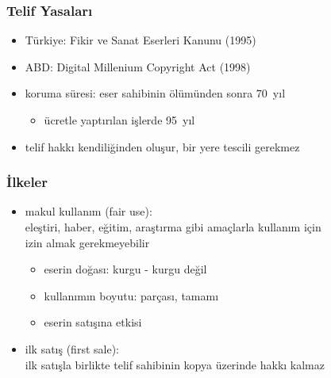 \documentclass[dvipsnames]{beamer}
\theoremstyle{definition}
\theoremstyle{example}
\theoremstyle{plain}
\begin{document}
\begin{frame}
  \frametitle{Telif Yasaları}

  \begin{itemize}
    \item Türkiye: Fikir ve Sanat Eserleri Kanunu (1995)
    \item ABD: Digital Millenium Copyright Act (1998)

    \pause
    \medskip
    \item koruma süresi: eser sahibinin ölümünden sonra 70~yıl
    \begin{itemize}
      \item ücretle yaptırılan işlerde 95~yıl
    \end{itemize}

    \pause
    \medskip
    \item telif hakkı kendiliğinden oluşur, bir yere tescili gerekmez
  \end{itemize}
\end{frame}
%

\begin{frame}
  \frametitle{İlkeler}

  \begin{itemize}
    \item \alert{makul kullanım} (fair use):\\
      eleştiri, haber, eğitim, araştırma gibi amaçlarla kullanım için\\
      izin almak gerekmeyebilir
    \begin{itemize}
      \item eserin doğası: kurgu - kurgu değil
      \item kullanımın boyutu: parçası, tamamı
      \item eserin satışına etkisi
    \end{itemize}

    \pause
    \medskip
    \item \alert{ilk satış} (first sale):\\
      ilk satışla birlikte telif sahibinin kopya üzerinde hakkı kalmaz
  \end{itemize}
\end{frame}
\end{document}
